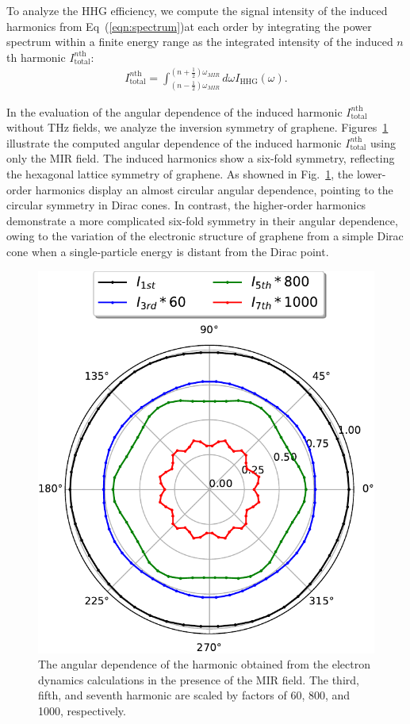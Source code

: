 To analyze the HHG efficiency, we compute the signal intensity of the induced harmonics from
Eq~(\ref{eqn:spectrum})at each
order by integrating the power spectrum within a finite energy range as  the integrated intensity
of the induced $n$th harmonic $I^{n \textrm{th}}_{\mathrm{total}}$:
\begin{align}
	I^{n \textrm{th}}_{\mathrm{total}} = \int_{\left (n-\frac{1}{2} \right )\omega_{MIR}}^{\left (n+\frac{1}{2} \right )\omega_{MIR}} d \omega I_{\textrm{HHG}} (\omega).
	\label{eqn:integrate_intensity}
\end{align}

In the evaluation of the angular dependence of the induced harmonic  $I^{n \textrm{th}}_{\mathrm{total}}$ without THz fields, we analyze the inversion symmetry of graphene. Figures~\ref{fig:SI_polar_mir} illustrate the computed angular dependence of the induced harmonic  $I^{n \textrm{th}}_{\mathrm{total}}$ using only the MIR field. The induced harmonics show a six-fold symmetry, reflecting the hexagonal lattice symmetry of graphene. As showned in Fig.~\ref{fig:SI_polar_mir}, the lower-order harmonics display an almost circular angular dependence, pointing to the circular symmetry in Dirac cones. In contrast, the higher-order harmonics demonstrate a more complicated six-fold symmetry in their angular dependence, owing to the variation of the electronic structure of graphene from a simple Dirac cone when a single-particle energy is distant from the Dirac point.
\begin{figure}[tb]
	\centering
	\includegraphics[width=0.50\linewidth]{pic/polar_mir.pdf}
	\caption{\label{fig:SI_polar_mir}
		The angular dependence of the harmonic  obtained from the electron dynamics calculations in the presence of the MIR field. The third, fifth, and seventh harmonic are scaled by factors of 60, 800, and 1000, respectively.
	}
\end{figure}
